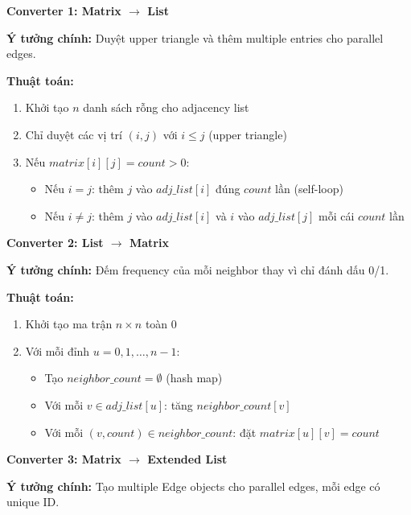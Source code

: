 \documentclass[12pt,a4paper]{article}
\begin{document}
\textbf{Converter 1: Matrix $\rightarrow$ List}

\textbf{Ý tưởng chính:} Duyệt upper triangle và thêm multiple entries cho parallel edges.

\textbf{Thuật toán:}
\begin{enumerate}
    \item Khởi tạo $n$ danh sách rỗng cho adjacency list
    \item Chỉ duyệt các vị trí $(i,j)$ với $i \leq j$ (upper triangle)
    \item Nếu $matrix[i][j] = count > 0$:
    \begin{itemize}
        \item Nếu $i = j$: thêm $j$ vào $adj\_list[i]$ đúng $count$ lần (self-loop)
        \item Nếu $i \neq j$: thêm $j$ vào $adj\_list[i]$ và $i$ vào $adj\_list[j]$ mỗi cái $count$ lần
    \end{itemize}
\end{enumerate}

\vspace{0.5cm}

\textbf{Converter 2: List $\rightarrow$ Matrix}

\textbf{Ý tưởng chính:} Đếm frequency của mỗi neighbor thay vì chỉ đánh dấu 0/1.

\textbf{Thuật toán:}
\begin{enumerate}
    \item Khởi tạo ma trận $n \times n$ toàn $0$
    \item Với mỗi đỉnh $u = 0, 1, \ldots, n-1$:
    \begin{itemize}
        \item Tạo $neighbor\_count = \emptyset$ (hash map)
        \item Với mỗi $v \in adj\_list[u]$: tăng $neighbor\_count[v]$
        \item Với mỗi $(v, count) \in neighbor\_count$: đặt $matrix[u][v] = count$
    \end{itemize}
\end{enumerate}

\vspace{0.5cm}

\textbf{Converter 3: Matrix $\rightarrow$ Extended List}

\textbf{Ý tưởng chính:} Tạo multiple Edge objects cho parallel edges, mỗi edge có unique ID.
\end{document}
